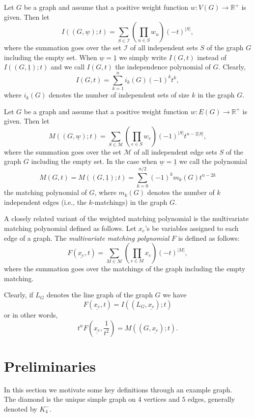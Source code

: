 \documentclass[12pt,a4paper]{amsart}
\numberwithin{equation}{section}
\begin{document}
\begin{nota}

Let $G$ be a graph and assume that a positive
  weight function $w:V(G)\rightarrow \mathbb{R^+}$ is given. Then let 
$$I((G,\underline{w});t)=\sum_{S\in \mathcal{I}}\left( \prod_{u\in
    S}w_u\right)(-t)^{|S|},$$ 
where the summation goes over the set $\mathcal{I}$ of all independent sets $S$
of the graph $G$ including the empty set. When $\underline{w}=\underline{1}$
we simply write $I(G,t)$ instead of $I((G,\underline{1});t)$ and we call
$I(G,t)$ the independence polynomial of $G$.  Clearly,
$$I(G,t)=\sum_{k=1}^ni_k(G)(-1)^kt^k,$$
where $i_k(G)$ denotes the number of independent sets of size $k$ in the graph
$G$. 

Let $G$ be a graph and assume that a positive
  weight function $w:E(G)\rightarrow \mathbb{R^+}$ is given. Then let 
$$M((G,\underline{w});t)=\sum_{S\in \mathcal{M}}\left( \prod_{e\in
    S}w_e\right)(-1)^{|S|}t^{n-2|S|},$$ 
where the summation goes over the set $\mathcal{M}$ of all independent edge
sets $S$ of the graph $G$ including the empty set. In the case when
$\underline{w}=\underline{1}$ we call the polynomial
$$M(G,t)=M((G,\underline{1});t)=\sum_{k=0}^{n/2}(-1)^km_k(G)t^{n-2k}$$
the matching polynomial of $G$, where $m_k(G)$ denotes the number of $k$
independent edges (i.e., the $k$-matchings) in the graph $G$.

A closely related variant of the weighted matching polynomial is the
multivariate matching polynomial defined as follows. Let $x_e$'s be variables
assigned to each edge of a graph. The \textit{multivariate matching
  polynomial}  $F$ is defined as follows: 
$$F(\underline{x_e},t)=\sum_{M\in \mathcal{M}}(\prod_{e\in M}x_e)(-t)^{|M|},$$
where the summation goes over the matchings of the graph including the empty
matching. 

Clearly, if $L_G$ denotes the line graph of the graph $G$ we have 
$$F(\underline{x_e},t)=I((L_G,\underline{x_e});t)$$
or in other words,
$$t^nF(\underline{x_e},\frac{1}{t^2})=M((G,\underline{x_e});t).$$
\end{nota}

\section{Preliminaries} 

In this section we motivate some key definitions through an example graph.\\
The diamond is the unique simple graph on $4$ vertices and $5$ edges,
generally denoted by $K_4^{-}$. 
\end{document}
